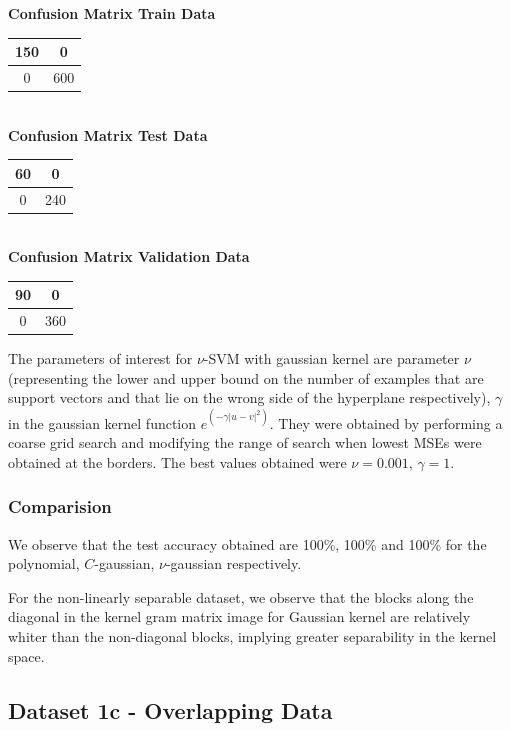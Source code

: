 \documentclass{article}
\begin{document}
\begin{flushleft}
\textbf{Confusion Matrix Train Data\\[5pt]}
\begin{tabular}{|c|c|}
\hline
150 & 0 \\
\hline
0 & 600\\
\hline
\end{tabular}
\textbf{\\[10pt] Confusion Matrix Test Data \\[5pt]}
\begin{tabular}{|c|c|}
\hline
60 & 0 \\
\hline
0 & 240\\
\hline
\end{tabular}
\textbf{\\[10pt] Confusion Matrix Validation Data \\[5pt]}
\begin{tabular}{|c|c|}
\hline
90 & 0 \\
\hline
0 & 360\\
\hline
\end{tabular}
\end{flushleft}



The parameters of interest for $\nu$-SVM with gaussian kernel are parameter $\nu$(representing the lower and upper bound on the number of examples that are support vectors and that lie on the wrong side of the hyperplane respectively), $\gamma$ in the gaussian kernel function $e^{(-\gamma|u-v|^{2})}$. They were obtained by performing a coarse grid search and modifying the range of search when lowest MSEs were obtained at the borders.
The best values obtained were $\nu=0.001$, $\gamma=1$.

\subsubsection{Comparision}
We observe that the test accuracy obtained are 100\%, 100\% and 100\% for the polynomial, $C$-gaussian, $\nu$-gaussian respectively.

For the non-linearly separable dataset, we observe that the blocks along the diagonal in the kernel gram matrix image for Gaussian kernel are relatively whiter than the non-diagonal blocks, implying greater separability in the kernel space.
\newpage

\subsection{Dataset 1c - Overlapping Data}
\end{document}
